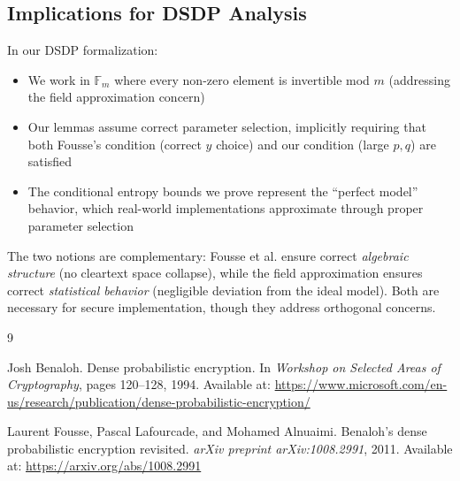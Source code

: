 \documentclass[11pt]{article}
\theoremstyle{definition}
\begin{document}
\subsection{Implications for DSDP Analysis}

In our DSDP formalization:
\begin{itemize}
\item We work in $\mathbb{F}_m$ where every non-zero element is invertible mod $m$ 
  (addressing the field approximation concern)
\item Our lemmas assume correct parameter selection, implicitly requiring that both 
  Fousse's condition (correct $y$ choice) and our condition (large $p, q$) are satisfied
\item The conditional entropy bounds we prove represent the ``perfect model'' behavior, 
  which real-world implementations approximate through proper parameter selection
\end{itemize}

The two notions are complementary: Fousse et al. ensure correct \emph{algebraic structure} 
(no cleartext space collapse), while the field approximation ensures correct 
\emph{statistical behavior} (negligible deviation from the ideal model). Both are necessary 
for secure implementation, though they address orthogonal concerns.


\begin{thebibliography}{9}

Josh Benaloh.
\newblock Dense probabilistic encryption.
\newblock In \emph{Workshop on Selected Areas of Cryptography}, pages 120--128, 1994.
\newblock Available at: \url{https://www.microsoft.com/en-us/research/publication/dense-probabilistic-encryption/}

Laurent Fousse, Pascal Lafourcade, and Mohamed Alnuaimi.
\newblock Benaloh's dense probabilistic encryption revisited.
\newblock \emph{arXiv preprint arXiv:1008.2991}, 2011.
\newblock Available at: \url{https://arxiv.org/abs/1008.2991}

\end{thebibliography}
\end{document}
